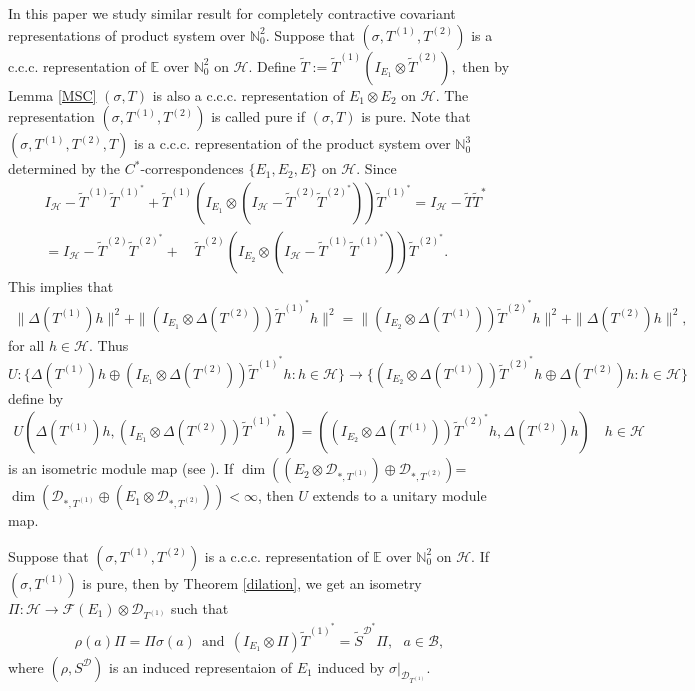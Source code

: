\documentclass[12pt]{amsart}
\numberwithin{equation}{section}
\theoremstyle{plain}
\newcommand{\ot}{\otimes}
\newcommand{\wt}{\widetilde}
\newcommand{\wT}{\wt{T}}
\begin{document}
In this paper we study similar result for completely contractive covariant representations of product system over $\mathbb{N}_0^2.$ 
Suppose that $(\sigma , T^{(1)},T^{(2)})$ is a c.c.c. representation of $\mathbb{E}$ over $\mathbb{N}_0^2$ on  $\mathcal{H}.$ Define $\widetilde{T}:=\widetilde{T}^{(1)}(I_{E_1} \otimes \widetilde{T}^{(2)}),$ then by Lemma \ref{MSC} $(\sigma, T)$ is also a c.c.c. representation of $E_1 \ot E_2$ on $\mathcal{H}.$ The representation $(\sigma , T^{(1)},T^{(2)})$ is called pure if $(\sigma, T)$ is pure. Note that $(\sigma , T^{(1)},T^{(2)}, T)$ is a c.c.c. representation of the product system  over $\mathbb{N}_0^3$ determined by the $C^*$-correspondences $\{E_1, E_2, E\}$ on $\mathcal{H}.$ Since
	\begin{align}\label{BB1}
	&I_{\mathcal H}-\widetilde{T}^{(1)}\widetilde{T}^{(1)^*}+\widetilde{T}^{(1)}(I_{E_1}\otimes(I_{\mathcal{H}}-\widetilde{T}^{(2)}\widetilde{T}^{(2)^*}))\widetilde{T}^{(1)^*}=	I_{\mathcal H}-{\widetilde T}{\widetilde T^*}\\& \nonumber=I_{\mathcal H}-\widetilde{T}^{(2)}\widetilde{T}^{(2)^*}+
	\quad \widetilde{T}^{(2)}(I_{E_2}\otimes(I_{\mathcal{H}}-\widetilde{T}^{(1)}\widetilde{T}^{(1)^*}))\widetilde{T}^{(2)^*}.
	\end{align}
This implies that
\begin{align*}
\|\Delta(T^{(1)})h\|^2+\|(I_{E_1} \ot \Delta(T^{(2)}))\wT^{(1)^*}h\|^2
=\|(I_{E_2} \ot \Delta(T^{(1)}))\wT^{(2)^*}h\|^2+\|\Delta(T^{(2)})h\|^2,
\end{align*} for all $h\in \mathcal{H}.$
Thus $$U:\{\Delta(T^{(1)})h\oplus (I_{E_1} \ot \Delta(T^{(2)}))\wT^{(1)^*}h: h\in \mathcal{H}\}\to \{(I_{E_2} \ot \Delta(T^{(1)}))\wT^{(2)^*}h\oplus \Delta(T^{(2)})h: h\in \mathcal{H}\}$$ define by
\begin{align}\label{equation1}
	 U(\Delta(T^{(1)})h,  (I_{E_1} \ot \Delta(T^{(2)}))\wT^{(1)^*}h)=((I_{E_2} \ot \Delta(T^{(1)}))\wT^{(2)^*}h, \Delta(T^{(2)})h) \quad h\in \mathcal H \end{align} is an isometric module map (see \cite{ARDS1}). If  $ \dim ((E_2 \ot \mathcal{D}_{*, T^{(1)}}) \oplus  \mathcal{D}_{*, T^{(2)}} )$=$ \dim (\mathcal{D}_{*, T^{(1)}} \oplus  (E_1 \ot\mathcal{D}_{*, T^{(2)}}))< \infty$, then $U$ extends to a unitary module map.
 
 
  Suppose that $(\sigma , T^{(1)},T^{(2)})$ is a c.c.c. representation of $\mathbb{E}$ over $\mathbb{N}_0^2$ on  $\mathcal{H}.$ If $(\sigma , T^{(1)})$ is pure, then by Theorem \ref{dilation}, we get an isometry $\Pi: \mathcal{H} \longrightarrow \mathcal{F}(E_1)\otimes\mathcal{D}_{ T^{(1)}}$ such that 
\begin{align}
	\rho(a)\Pi=\Pi \sigma(a) \:\: \mbox{and} \:\: (I_{E_1} \ot \Pi)\widetilde{T}^{(1)^*}=\widetilde{S}^{\mathcal{D}^*}\Pi, \:\:\:a \in \mathcal{B}, 
\end{align} where $(\rho, S^{\mathcal{D}})$ is an induced representaion of $E_1$ induced by $\sigma|_{\mathcal{D}_{T^{(1)}}}.$ 
\end{document}
